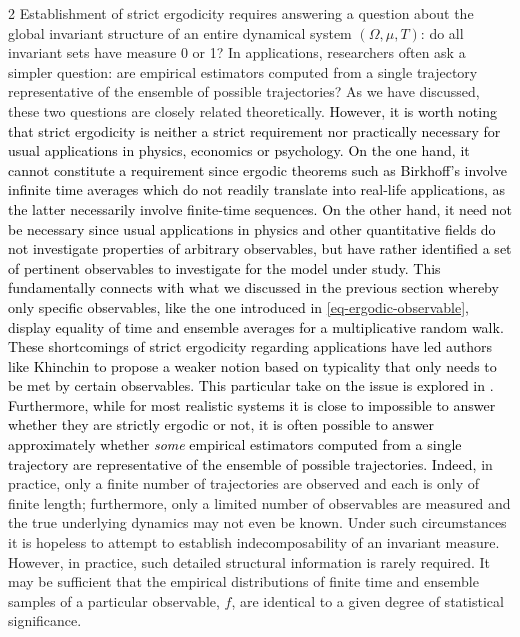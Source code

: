 \documentclass[11pt]{article}
\begin{document}
\begin{multicols}{2}
\label{sec-practical-applications}
Establishment of strict ergodicity requires answering a question about the global invariant structure of an entire dynamical system $(\Omega, \mu, T)$:  do all invariant sets have measure 0 or 1?
In applications, researchers often ask a simpler question: are empirical estimators computed from a single trajectory representative of the ensemble of possible trajectories?
As we have discussed, these two questions are closely related theoretically.
\textcolor{black}{However, it is worth noting that strict ergodicity is neither a strict requirement nor practically necessary for usual applications in physics, economics or psychology. On the one hand, it cannot constitute a requirement since ergodic theorems such as Birkhoff's involve infinite time averages which do not readily translate into real-life applications, as the latter necessarily involve finite-time sequences. On the other hand, it need not be necessary since usual applications in physics and other quantitative fields do not investigate properties of arbitrary observables, but have rather identified a set of pertinent observables to investigate for the model under study. This fundamentally connects with what we discussed in the previous section whereby only specific observables, like the one introduced in \eqref{eq-ergodic-observable}, display equality of time and ensemble averages for a multiplicative random walk. These shortcomings of strict ergodicity regarding applications have led authors like Khinchin to propose a weaker notion based on typicality that only needs to be met by certain observables. This particular take on the issue is explored in \cite{LucenteEtAl_KhinchinErgodicity}.   
Furthermore, while for most realistic systems it is close to impossible to answer whether they are strictly ergodic or not, it is often possible to answer approximately whether {\it some} empirical estimators computed from a single trajectory are representative of the ensemble of possible trajectories. Indeed,} in practice, only a finite number of trajectories are observed and each is only of finite length; furthermore, only a limited number of observables are measured and the true underlying dynamics may not even be known.
Under such circumstances it is hopeless to attempt to establish indecomposability of an invariant measure.
However,  in practice, such detailed structural information is rarely required.
It may be sufficient that the empirical distributions of finite time and ensemble samples of a particular observable, $f$, are identical to a given degree of statistical significance.

\end{multicols}
\end{document}
